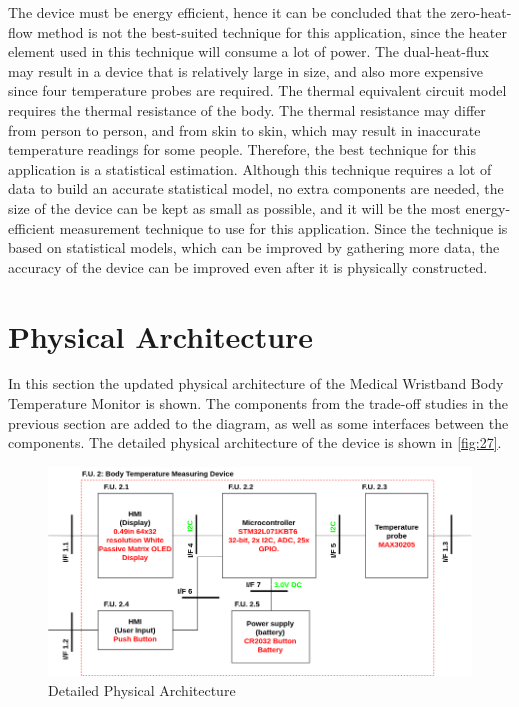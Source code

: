 The device must be energy efficient, hence it can be concluded that the zero-heat-flow method is not the best-suited technique for this application, since the heater element used in this technique will consume a lot of power. The dual-heat-flux may result in a device that is relatively large in size, and also more expensive since four temperature probes are required. The thermal equivalent circuit model requires the thermal resistance of the body. The thermal resistance may differ from person to person, and from skin to skin, which may result in inaccurate temperature readings for some people. Therefore, the best technique for this application is a statistical estimation. Although this technique requires a lot of data to build an accurate statistical model, no extra components are needed, the size of the device can be kept as small as possible, and it will be the most energy-efficient measurement technique to use for this application. Since the technique is based on statistical models, which can be improved by gathering more data, the accuracy of the device can be improved even after it is physically constructed.

\section{Physical Architecture}
In this section the updated physical architecture of the Medical Wristband Body Temperature Monitor is shown. The components from the trade-off studies in the previous section are added to the diagram, as well as some interfaces between the components. The detailed physical architecture of the device is shown in \autoref{fig:27}.
\begin{figure}[H]
	\centering
	\includegraphics[scale=0.5]{img/Detail_PA}
	\caption{Detailed Physical Architecture}
	\label{fig:27}
\end{figure}


